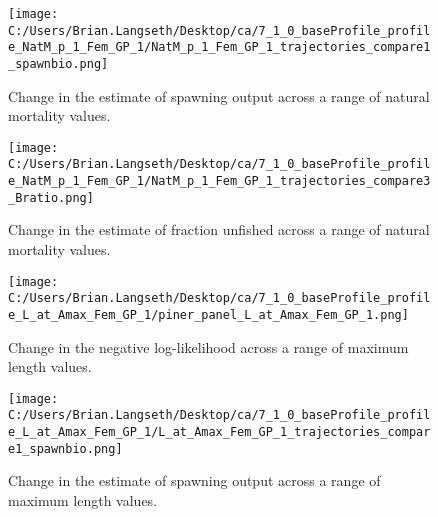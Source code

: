 \documentclass[11pt,
  english,
  a4paper,
]{article}
\begin{document}
\begin{figure}
\centering
\texttt{[image: C:/Users/Brian.Langseth/Desktop/ca/7\_1\_0\_baseProfile\_profile\_NatM\_p\_1\_Fem\_GP\_1/NatM\_p\_1\_Fem\_GP\_1\_trajectories\_compare1\_spawnbio.png]}
\caption{Change in the estimate of spawning output across a range of natural mortality values.\label{fig:m-ssb}}
\end{figure}

\tagmcend\tagstructend


\begin{figure}
\centering
\texttt{[image: C:/Users/Brian.Langseth/Desktop/ca/7\_1\_0\_baseProfile\_profile\_NatM\_p\_1\_Fem\_GP\_1/NatM\_p\_1\_Fem\_GP\_1\_trajectories\_compare3\_Bratio.png]}
\caption{Change in the estimate of fraction unfished across a range of natural mortality values.\label{fig:m-depl}}
\end{figure}

\tagmcend\tagstructend


\begin{figure}
\centering
\texttt{[image: C:/Users/Brian.Langseth/Desktop/ca/7\_1\_0\_baseProfile\_profile\_L\_at\_Amax\_Fem\_GP\_1/piner\_panel\_L\_at\_Amax\_Fem\_GP\_1.png]}
\caption{Change in the negative log-likelihood across a range of maximum length values.\label{fig:linf-profile}}
\end{figure}

\tagmcend\tagstructend


\begin{figure}
\centering
\texttt{[image: C:/Users/Brian.Langseth/Desktop/ca/7\_1\_0\_baseProfile\_profile\_L\_at\_Amax\_Fem\_GP\_1/L\_at\_Amax\_Fem\_GP\_1\_trajectories\_compare1\_spawnbio.png]}
\caption{Change in the estimate of spawning output across a range of maximum length values.\label{fig:linf-ssb}}
\end{figure}

\tagmcend\tagstructend
\end{document}
